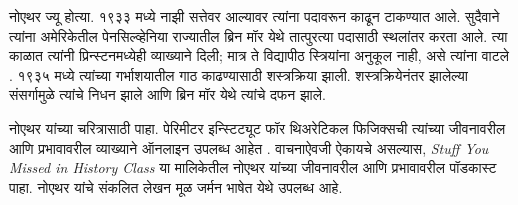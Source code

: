 \documentclass[../../../include/open-logic-section]{subfiles}
\begin{document}
नोएथर ज्यू होत्या. १९३३ मध्ये नाझी सत्तेवर आल्यावर त्यांना पदावरून काढून टाकण्यात आले. सुदैवाने त्यांना अमेरिकेतील पेनसिल्व्हेनिया राज्यातील ब्रिन मॉर येथे तात्पुरत्या पदासाठी स्थलांतर करता आले. त्या काळात त्यांनी प्रिन्स्टनमध्येही व्याख्याने दिली; मात्र ते विद्यापीठ स्त्रियांना अनुकूल नाही, असे त्यांना वाटले \citep[81]{Dick1981}. १९३५ मध्ये त्यांच्या गर्भाशयातील गाठ काढण्यासाठी शस्त्रक्रिया झाली. शस्त्रक्रियेनंतर झालेल्या संसर्गामुळे त्यांचे निधन झाले आणि ब्रिन मॉर येथे त्यांचे दफन झाले.

\begin{reading}
नोएथर यांच्या चरित्रासाठी \citet{Dick1981} पाहा. पेरिमीटर इन्स्टिट्यूट फॉर थिअरेटिकल फिजिक्सची त्यांच्या जीवनावरील आणि प्रभावावरील व्याख्याने ऑनलाइन उपलब्ध आहेत \citep{Perimeter2015}. वाचनाऐवजी ऐकायचे असल्यास, \emph{Stuff You Missed in History Class} या मालिकेतील नोएथर यांच्या जीवनावरील आणि प्रभावावरील पॉडकास्ट \citep{Frey2015} पाहा. नोएथर यांचे संकलित लेखन मूळ जर्मन भाषेत \citep{Noether1983} येथे उपलब्ध आहे.
\end{reading}
\end{document}
